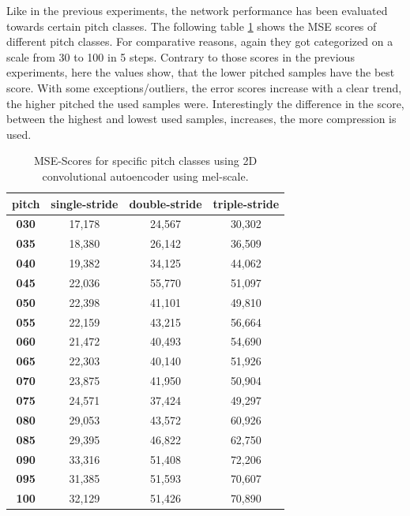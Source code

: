 Like in the previous experiments, the network performance has been evaluated towards certain pitch classes. The following table \ref{tab:res_scores_2D_pitch_mel} shows the MSE scores of different pitch classes. For comparative reasons, again they got categorized on a scale from 30 to 100 in 5 steps. Contrary to those scores in the previous experiments, here the values show, that the lower pitched samples have the best score. With some exceptions/outliers, the error scores increase with a clear trend, the higher pitched the used samples were. Interestingly the difference in the score, between the highest and lowest used samples, increases, the more compression is used. 

\begin{table}[htb!]
\centering
\begin{tabular}{|c|c|c|c|}
\hline
\textbf{pitch} & \textbf{single-stride} & \textbf{double-stride} & \textbf{triple-stride} \\ \hline
\textbf{030}   & 17,178                 & 24,567                 & 30,302                 \\ \hline
\textbf{035}   & 18,380                 & 26,142                 & 36,509                 \\ \hline
\textbf{040}   & 19,382                 & 34,125                 & 44,062                 \\ \hline
\textbf{045}   & 22,036                 & 55,770                 & 51,097                 \\ \hline
\textbf{050}   & 22,398                 & 41,101                 & 49,810                 \\ \hline
\textbf{055}   & 22,159                 & 43,215                 & 56,664                 \\ \hline
\textbf{060}   & 21,472                 & 40,493                 & 54,690                 \\ \hline
\textbf{065}   & 22,303                 & 40,140                 & 51,926                 \\ \hline
\textbf{070}   & 23,875                 & 41,950                 & 50,904                 \\ \hline
\textbf{075}   & 24,571                 & 37,424                 & 49,297                 \\ \hline
\textbf{080}   & 29,053                 & 43,572                 & 60,926                 \\ \hline
\textbf{085}   & 29,395                 & 46,822                 & 62,750                 \\ \hline
\textbf{090}   & 33,316                 & 51,408                 & 72,206                 \\ \hline
\textbf{095}   & 31,385                 & 51,593                 & 70,607                 \\ \hline
\textbf{100}   & 32,129                 & 51,426                 & 70,890                 \\ \hline
\end{tabular}
\caption{MSE-Scores for specific pitch classes using 2D convolutional autoencoder using mel-scale.}
\label{tab:res_scores_2D_pitch_mel}
\end{table}

